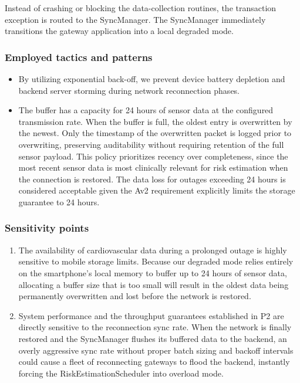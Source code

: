 Instead of crashing or blocking the data-collection routines, the transaction exception is routed to the SyncManager. The SyncManager immediately transitions the gateway application into a local degraded mode.

\subsubsection*{Employed tactics and patterns}
\begin{itemize}
	\item By utilizing exponential back-off, we prevent device battery depletion and backend server storming during network reconnection phases.
	\item The buffer has a capacity for 24 hours of sensor data at the configured transmission rate. When the buffer is full, the oldest entry is overwritten by the newest. Only the timestamp of the overwritten packet is logged prior to overwriting, preserving auditability without requiring retention of the full sensor payload. This policy prioritizes recency over completeness, since the most recent sensor data is most clinically relevant for risk estimation when the connection is restored. The data loss for outages exceeding 24 hours is considered acceptable given the Av2 requirement explicitly limits the storage guarantee to 24 hours.
\end{itemize}

\subsubsection*{Sensitivity points}
\begin{enumerate}
	\item The availability of cardiovascular data during a prolonged outage is highly sensitive to mobile storage limits. Because our degraded mode relies entirely on the smartphone's local memory to buffer up to 24 hours of sensor data, allocating a buffer size that is too small will result in the oldest data being permanently overwritten and lost before the network is restored.
	\item System performance and the throughput guarantees established in P2 are directly sensitive to the reconnection sync rate. When the network is finally restored and the SyncManager flushes its buffered data to the backend, an overly aggressive sync rate without proper batch sizing and backoff intervals could cause a fleet of reconnecting gateways to flood the backend, instantly forcing the RiskEstimationScheduler into overload mode.
\end{enumerate}

